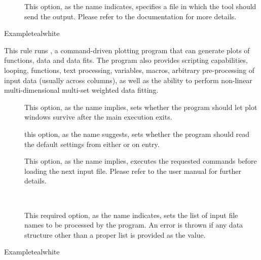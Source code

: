\begin{description}
\begin{description}
\item[] This option, as the name indicates, specifies a file in which the tool should send the output. Please refer to the documentation for more details.
\end{description}

\begin{codebox}{Example}{teal}{\icnote}{white}
\end{codebox}

\item[\rulebox{gnuplot}]
This rule runs , a command-driven plotting program that can generate plots of functions, data and data fits. The program also provides scripting capabilities, looping, functions, text processing, variables, macros, arbitrary pre-processing of input data (usually across columns), as well as the ability to perform non-linear multi-dimensional multi-set weighted data fitting.

\begin{description}
\item[] This option, as the name implies, sets whether the program should let plot windows survive after the main execution exits.

\item[] this option, as the name suggests, sets whether the program should read the default settings from either  or  on entry.

\item[] This option, as the name implies, executes the requested commands before loading the next input file. Please refer to the user manual for further details.

\item[~\rqbox] This required option, as the name indicates, sets the list of input file names to be processed by the program. An error is thrown if any data structure other than a proper list is provided as the value.
\end{description}

\begin{codebox}{Example}{teal}{\icnote}{white}
\end{codebox}


\end{description}
